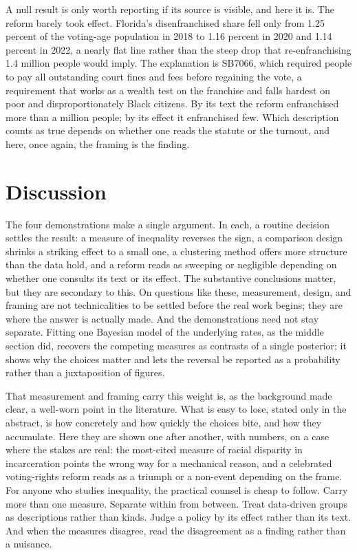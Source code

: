 \documentclass[
  12pt,
]{article}
\begin{document}
A null result is only worth reporting if its source is visible, and here
it is. The reform barely took effect. Florida's disenfranchised share
fell only from 1.25 percent of the voting-age population in 2018 to 1.16
percent in 2020 and 1.14 percent in 2022, a nearly flat line rather than
the steep drop that re-enfranchising 1.4 million people would imply. The
explanation is SB7066, which required people to pay all outstanding
court fines and fees before regaining the vote, a requirement that works
as a wealth test on the franchise and falls hardest on poor and
disproportionately Black citizens. By its text the reform enfranchised
more than a million people; by its effect it enfranchised few. Which
description counts as true depends on whether one reads the statute or
the turnout, and here, once again, the framing is the finding.

\section{Discussion}\label{discussion}

The four demonstrations make a single argument. In each, a routine
decision settles the result: a measure of inequality reverses the sign,
a comparison design shrinks a striking effect to a small one, a
clustering method offers more structure than the data hold, and a reform
reads as sweeping or negligible depending on whether one consults its
text or its effect. The substantive conclusions matter, but they are
secondary to this. On questions like these, measurement, design, and
framing are not technicalities to be settled before the real work
begins; they are where the answer is actually made. And the
demonstrations need not stay separate. Fitting one Bayesian model of the
underlying rates, as the middle section did, recovers the competing
measures as contrasts of a single posterior; it shows why the choices
matter and lets the reversal be reported as a probability rather than a
juxtaposition of figures.

That measurement and framing carry this weight is, as the background
made clear, a well-worn point in the literature. What is easy to lose,
stated only in the abstract, is how concretely and how quickly the
choices bite, and how they accumulate. Here they are shown one after
another, with numbers, on a case where the stakes are real: the
most-cited measure of racial disparity in incarceration points the wrong
way for a mechanical reason, and a celebrated voting-rights reform reads
as a triumph or a non-event depending on the frame. For anyone who
studies inequality, the practical counsel is cheap to follow. Carry more
than one measure. Separate within from between. Treat data-driven groups
as descriptions rather than kinds. Judge a policy by its effect rather
than its text. And when the measures disagree, read the disagreement as
a finding rather than a nuisance.
\end{document}
